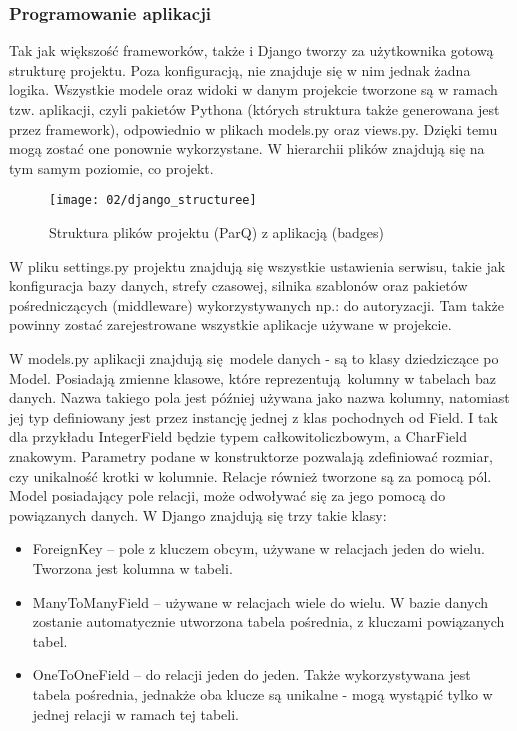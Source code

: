 \subsubsection*{Programowanie aplikacji}
Tak jak większość frameworków, także i Django tworzy za użytkownika gotową strukturę projektu. Poza konfiguracją, nie znajduje się w nim jednak żadna logika. Wszystkie modele oraz widoki w danym projekcie tworzone są w ramach tzw. aplikacji, czyli pakietów Pythona (których struktura także generowana jest przez framework), odpowiednio w plikach models.py oraz views.py. Dzięki temu mogą zostać one ponownie wykorzystane. W hierarchii plików znajdują się na tym samym poziomie, co projekt. 

\begin{figure}[h]
	\begin{center}
		\texttt{[image: 02/django\_structuree]}
	\end{center}
	\caption{Struktura plików projektu (ParQ) z aplikacją (badges)}
	\vspace{-0.3cm}
\end{figure}

W pliku settings.py projektu znajdują się wszystkie ustawienia serwisu, takie jak konfiguracja bazy danych, strefy czasowej, silnika szablonów oraz pakietów pośredniczących (middleware) wykorzystywanych np.: do autoryzacji. Tam także powinny zostać zarejestrowane wszystkie aplikacje używane w projekcie.

W models.py aplikacji znajdują się modele danych - są to klasy dziedziczące po Model. Posiadają zmienne klasowe, które reprezentują kolumny w tabelach baz danych. Nazwa takiego pola jest później używana jako nazwa kolumny, natomiast jej typ definiowany jest przez instancję jednej z klas pochodnych od Field. I tak dla przykładu IntegerField będzie typem całkowitoliczbowym, a CharField znakowym. Parametry podane w konstruktorze pozwalają zdefiniować rozmiar, czy unikalność krotki w kolumnie. Relacje również tworzone są za pomocą pól. Model posiadający pole relacji, może odwoływać się za jego pomocą do powiązanych danych. W Django znajdują się trzy takie klasy:

\begin{itemize}
	\item ForeignKey -- pole z kluczem obcym, używane w relacjach jeden do wielu. Tworzona jest kolumna w tabeli.
	\item ManyToManyField -- używane w relacjach wiele do wielu. W bazie danych zostanie automatycznie utworzona tabela pośrednia, z kluczami powiązanych tabel.
	\item OneToOneField -- do relacji jeden do jeden. Także wykorzystywana jest tabela pośrednia, jednakże oba klucze są unikalne - mogą wystąpić tylko w jednej relacji w ramach tej tabeli.
\end{itemize}

